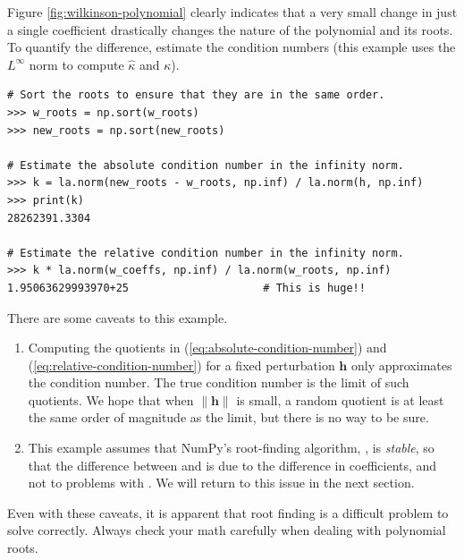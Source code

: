 Figure \ref{fig:wilkinson-polynomial} clearly indicates that a very small change in just a single coefficient drastically changes the nature of the polynomial and its roots.
To quantify the difference, estimate the condition numbers (this example uses the $L^\infty$ norm to compute $\hat{\kappa}$ and $\kappa$).

\begin{lstlisting}
# Sort the roots to ensure that they are in the same order.
>>> w_roots = np.sort(w_roots)
>>> new_roots = np.sort(new_roots)

# Estimate the absolute condition number in the infinity norm.
>>> k = la.norm(new_roots - w_roots, np.inf) / la.norm(h, np.inf)
>>> print(k)
28262391.3304

# Estimate the relative condition number in the infinity norm.
>>> k * la.norm(w_coeffs, np.inf) / la.norm(w_roots, np.inf)
1.95063629993970+25                     # This is huge!!
\end{lstlisting}

There are some caveats to this example.
\begin{enumerate}
\item Computing the quotients in (\ref{eq:absolute-condition-number}) and (\ref{eq:relative-condition-number}) for a fixed perturbation $\mathbf{h}$ only approximates the condition number.
The true condition number is the limit of such quotients.
We hope that when $\|\mathbf{h}\|$ is small, a random quotient is at least the same order of magnitude as the limit, but there is no way to be sure.

\item This example assumes that NumPy's root-finding algorithm, , is \emph{stable}, so that the difference between  and  is due to the difference in coefficients, and not to problems with .
We will return to this issue in the next section.
\end{enumerate}
Even with these caveats, it is apparent that root finding is a difficult problem to solve correctly.
Always check your math carefully when dealing with polynomial roots.

